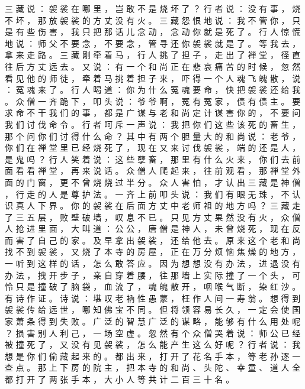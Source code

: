 {三 藏 说 ： 袈 裟 在 哪 里 ， 岂 敢 不 是 烧 坏 了 ？ 行 者 说 ： 没 有 事 ， 烧 不 坏 ， 那 放 袈 裟 的 方 丈 没 有 火 。
三 藏 怨 恨 地 说 ： 我 不 管 你 ， 只 是 有 些 伤 害 ， 我 只 把 那 话 儿 念 动 ， 念 动 你 就 是 死 了 。
行 人 惊 慌 地 说 ： 师 父 不 要 念 ， 不 要 念 ， 管 寻 还 你 袈 裟 就 是 了 。
等 我 去 ， 拿 来 走 路 。
三 藏 刚 牵 着 马 ， 行 人 挑 了 担 子 ， 走 出 了 禅 堂 ， 径 直 往 后 方 丈 远 去 。
又 说 ： 有 一 个 和 尚 正 在 悲 哀 痛 苦 的 时 候 ， 忽 然 看 见 他 的 师 徒 ， 牵 着 马 挑 着 担 子 来 ， 吓 得 一 个 人 魂 飞 魄 散 ， 说 ： 冤 魂 来 了 。
行 人 喝 道 ： 你 为 什 么 冤 魂 要 命 ， 快 把 袈 裟 还 给 我 。
众 僧 一 齐 跪 下 ， 叩 头 说 ： 爷 爷 啊 ， 冤 有 冤 家 ， 债 有 债 主 。
要 求 命 不 干 我 们 的 事 ， 都 是 广 谋 与 老 和 尚 定 计 谋 害 你 的 ， 不 要 问 我 们 讨 伐 命 令 。
行 者 呵 斥 一 声 说 ： 我 把 你 们 这 些 该 死 的 畜 生 ， 那 个 问 你 们 讨 得 什 么 命 ？
其 中 有 两 个 胆 量 大 的 和 尚 说 ： 老 爷 ， 你 们 在 禅 堂 里 已 经 烧 死 了 ， 现 在 又 来 讨 伐 袈 裟 ， 端 的 还 是 人 ， 是 鬼 吗 ？ 行 人 笑 着 说 ： 这 些 孽 畜 ， 那 里 有 什 么 火 来 ， 你 们 去 前 面 看 看 禅 堂 ， 再 来 说 话 。
众 僧 人 爬 起 来 ， 往 前 观 看 ， 那 禅 堂 外 面 的 门 窗 ， 更 不 曾 烧 烧 过 半 分 。
众 人 害 怕 ， 才 认 出 三 藏 是 神 僧 ， 行 走 的 人 是 尊 护 法 。
一 齐 上 前 叩 头 说 ： 我 们 有 眼 无 珠 ， 不 认 识 真 人 下 界 。
你 的 袈 裟 在 后 面 方 丈 中 老 师 祖 的 地 方 吗 ？
三 藏 走 了 三 五 层 ， 败 壁 破 墙 ， 叹 息 不 已 。
只 见 方 丈 果 然 没 有 火 ， 众 僧 人 抢 进 里 面 ， 大 叫 道 ： 公 公 ， 唐 僧 是 神 人 ， 未 曾 烧 死 ， 现 在 反 而 害 了 自 己 的 家 。
及 早 拿 出 袈 裟 ， 还 给 他 去 。
原 来 这 个 老 和 尚 找 不 到 袈 裟 ， 又 烧 了 本 寺 的 房 屋 ， 正 在 万 分 烦 恼 焦 燥 的 地 方 ， 一 听 到 这 样 的 话 ， 怎 么 敢 答 应 。
因 为 想 想 没 有 办 法 ， 进 退 没 有 办 法 ， 拽 开 步 子 ， 亲 自 穿 着 腰 ， 往 那 墙 上 实 际 撞 了 一 个 头 ， 可 怜 只 是 撞 破 了 脑 袋 ， 血 流 了 ， 魂 魄 散 开 ， 咽 喉 气 断 ， 染 红 沙 。
有 诗 作 证 。
诗 说 ： 堪 叹 老 衲 性 愚 蒙 ， 枉 作 人 间 一 寿 翁 。
想 得 到 袈 裟 传 给 远 世 ， 哪 知 佛 宝 不 同 。
但 将 领 容 易 长 久 ， 一 定 会 使 国 家 萧 条 得 到 失 败 。
广 泛 的 智 慧 广 泛 的 谋 略 ， 能 够 有 什 么 用 处 呢 ？ 损 害 别 人 利 己 ， 一 场 空 虚 。
忽 然 有 个 众 僧 哭 着 说 ： 师 公 已 经 被 撞 死 了 ， 又 没 有 见 袈 裟 ， 怎 么 能 产 生 这 么 好 呢 ？ 行 者 说 ： 我 想 是 你 们 偷 藏 起 来 的 。
都 出 来 ， 打 开 了 花 名 手 本 ， 等 老 孙 逐 一 查 点 。
那 上 下 房 的 院 主 ， 把 本 寺 的 和 尚 、 头 陀 、 幸 童 、 道 人 全 都 打 开 了 两 张 手 本 ， 大 小 人 等 共 计 二 百 三 十 名 。
}
